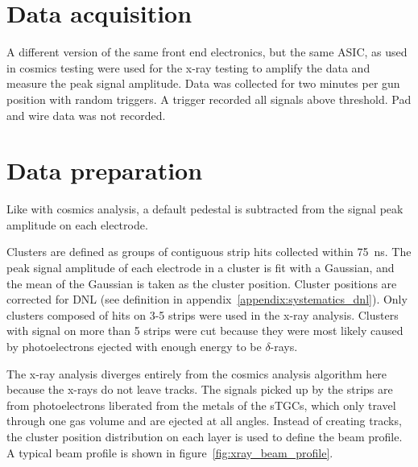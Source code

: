 \section{Data acquisition}

A different version of the same front end electronics, but the same ASIC, as used in cosmics testing were used for the x-ray testing to amplify the data and measure the peak signal amplitude. Data was collected for two minutes per gun position with random triggers. A trigger recorded all signals above threshold. Pad and wire data was not recorded.

\section{Data preparation}

Like with cosmics analysis, a default pedestal is subtracted from the signal peak amplitude on each electrode.

Clusters are defined as groups of contiguous strip hits collected within \SI{75}{ns}. The peak signal amplitude of each electrode in a cluster is fit with a Gaussian, and the mean of the Gaussian is taken as the cluster position. Cluster positions are corrected for DNL (see definition in appendix~\ref{appendix:systematics_dnl}). Only clusters composed of hits on 3-5 strips were used in the x-ray analysis. Clusters with signal on more than 5 strips were cut because they were most likely caused by photoelectrons ejected with enough energy to  be $\delta$-rays.

The x-ray analysis diverges entirely from the cosmics analysis algorithm here because the x-rays do not leave tracks. The signals picked up by the strips are from photoelectrons liberated from the metals of the sTGCs, which only travel through one gas volume and are ejected at all angles. Instead of creating tracks, the cluster position distribution on each layer is used to define the beam profile. A typical beam profile is shown in figure~\ref{fig:xray_beam_profile}.

